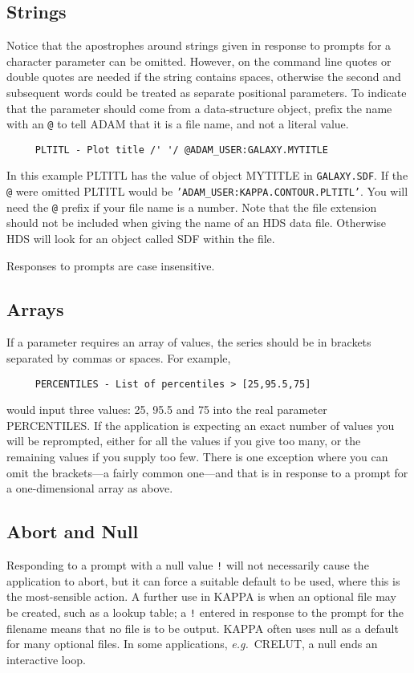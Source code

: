 \subsection{Strings}
\label{se:parstring}
Notice that the apostrophes around strings given in response to prompts
for a character parameter can be omitted. However, on the command
line quotes or double quotes are needed if the string contains spaces,
otherwise the second and subsequent words could be treated as
separate positional parameters.
To indicate that the parameter should come from a
data-structure object, prefix the name with an {\tt @} to tell {\small ADAM}
that it is a file name, and not a literal value.

\small
\begin{verbatim}
     PLTITL - Plot title /' '/ @ADAM_USER:GALAXY.MYTITLE
\end{verbatim}
\normalsize
In this example PLTITL has the value of object MYTITLE in {\tt GALAXY.SDF}.
If the {\tt @} were omitted PLTITL would be
{\tt 'ADAM\_USER:KAPPA.CONTOUR.PLTITL'}.  You will need the {\tt @}
prefix if your file name is a number.
Note that the file extension should not be included when giving the
name of an HDS data file. Otherwise HDS will look for an object
called SDF within the file.

Responses to prompts are case insensitive.

\subsection{Arrays}
If a parameter requires an array of values, the series
should be in brackets separated by commas or spaces.  For example,

\small
\begin{verbatim}
     PERCENTILES - List of percentiles > [25,95.5,75]
\end{verbatim}
\normalsize
would input three values: 25, 95.5 and 75 into the real parameter
PERCENTILES.  If the application is expecting an exact number of values
you will be reprompted, either for all the values if you give too many,
or the remaining values if you supply too few.  There is one exception
where you can omit the brackets---a fairly common one---and that is in
response to a prompt for a one-dimensional array as above.

\subsection{Abort and Null}
Responding to a prompt with a null value {\tt !} will not necessarily
cause the application to abort, but it can force a suitable default to
be used, where this is the most-sensible action. A further use in KAPPA
is when an optional file may be created, such as a lookup table; a {\tt !}
entered in response to the prompt for the filename means that no file is
to be output. {\small KAPPA} often uses null as a default for many
optional files. In some applications, {\it e.g.}\ CRELUT, a null ends an
interactive loop.

